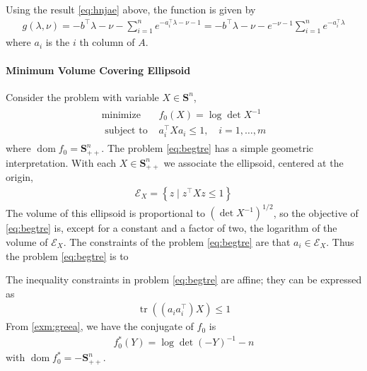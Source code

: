\documentclass{article}
\begin{document}
Using the result \cref{eq:hnjae} above, the  function is given by
\begin{align*}
g(\lambda, \nu)=-b^{\top} \lambda-\nu-\sum_{i=1}^{n} e^{-a_{i}^{\top} \lambda-\nu-1}=-b^{\top} \lambda-\nu-e^{-\nu-1} \sum_{i=1}^{n} e^{-a_{i}^{\top} \lambda}
\end{align*}
where $a_{i}$ is the $i$ th column of $A$.
\paragraph{Minimum Volume Covering Ellipsoid}
Consider the problem with variable $X \in \mathbf{S}^{n}$,
\begin{align}
\begin{array}{ll}
\operatorname{minimize} & f_{0}(X)=\log \operatorname{det} X^{-1} \\
\text { subject to } & a_{i}^{\top} X a_{i} \leq 1, \quad i=1, \ldots, m
\end{array}\label{eq:begtre}
\end{align}
where $\operatorname{dom} f_{0}=\mathbf{S}_{++}^{n}$. The problem \cref{eq:begtre} has a simple geometric interpretation. With each $X \in \mathbf{S}_{++}^{n}$ we associate the ellipsoid, centered at the origin,
\begin{align*}
\mathcal{E}_{X}=\left\{z \mid z^{\top} X z \leq 1\right\}
\end{align*}
The volume of this ellipsoid is proportional to $\left(\operatorname{det} X^{-1}\right)^{1 / 2}$, so the objective of \cref{eq:begtre} is, except for a constant and a factor of two, the logarithm of the volume of $\mathcal{E}_{X}$. The constraints of the problem \cref{eq:begtre} are that $a_{i} \in \mathcal{E}_{X}$. Thus the problem \cref{eq:begtre} is to 

The inequality constraints in problem \cref{eq:begtre} are affine; they can be expressed as
\begin{align*}
\operatorname{tr}\left(\left(a_{i} a_{i}^{\top}\right) X\right) \leq 1
\end{align*}
From \cref{exm:greea}, we have the conjugate of $f_{0}$ is
\begin{align*}
f_{0}^{*}(Y)=\log \operatorname{det}(-Y)^{-1}-n
\end{align*}
with $\operatorname{dom} f_{0}^{*}=-\mathbf{S}_{++}^{n}$. 
\end{document}

